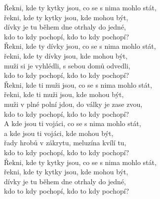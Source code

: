 
Řekni, kde ty kytky jsou, co se s nima mohlo stát,\\
řekni, kde ty kytky jsou, kde mohou být,\\
dívky je tu během dne otrhaly do jedné,\\
kdo to kdy pochopí, kdo to kdy pochopí?\\

Řekni, kde ty dívky jsou, co se s nima mohlo stát,\\
řekni, kde ty dívky jsou, kde mohou být,\\
muži si je vyhlédli, s sebou domů odvedli,\\
kdo to kdy pochopí, kdo to kdy pochopí?\\

Řekni, kde ti muži jsou, co se s nima mohlo stát,\\
řekni, kde ti muži jsou, kde mohou být,\\
muži v plné polní jdou, do války je zase zvou,\\
kdo to kdy pochopí, kdo to kdy pochopí?\\

A kde jsou ti vojáci, co se s nima mohlo stát,\\
a kde jsou ti vojáci, kde mohou být,\\
řady hrobů v zákrytu, meluzína kvílí tu,\\
kdo to kdy pochopí, kdo to kdy pochopí?\\

Řekni, kde ty kytky jsou, co se s nima mohlo stát,\\
řekni, kde ty kytky jsou, kde mohou být,\\
dívky je tu během dne otrhaly do jedné,\\
kdo to kdy pochopí, kdo to kdy pochopí?

\newpage
